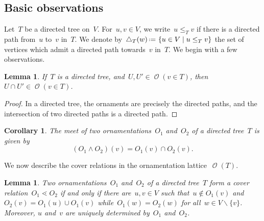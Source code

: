 \documentclass{amsart}
\newtheorem{corollary}[theorem]{Corollary}
\newtheorem{lemma}[theorem]{Lemma}
\theoremstyle{definition}
\renewcommand{\c}[1]{\mathcal{#1}} %
\newcommand{\set}[2]{\left\{ #1 \;\middle|\; #2 \right\}} %
\newcommand{\ssm}{\smallsetminus} %
\newcommand{\eqdef}{\mbox{\,\raisebox{0.2ex}{\scriptsize\ensuremath{\mathrm:}}\ensuremath{=}\,}} %
\newcommand{\meet}{\wedge} %
\DeclareMathOperator{\Orn}{\c{O}}  %
\begin{document}

\subsection{Basic observations}
\label{subsec:basicObservationsT}

Let~$T$ be a directed tree on~$V$.
For~$u,v \in V$, we write~$u \le_T v$ if there is a directed path from~$u$ to~$v$ in~$T$. %
We denote by~$\triangle_T(w) \eqdef \set{u \in V}{u \le_T v}$ the set of vertices which admit a directed path towards~$v$ in~$T$.
We begin with a few observations.

\begin{lemma}
\label{lem:meetOrnT}
If~$T$ is a directed tree, and~$U,U' \in \Orn(v \in T)$, then~$U \cap U' \in \Orn(v \in T)$.
\end{lemma}

\begin{proof}
In a directed tree, the ornaments are precisely the directed paths, and the intersection of two directed paths is a directed path.
\end{proof}

\begin{corollary}
\label{coro:meetOrnT}
The meet of two ornamentations~$O_1$ and~$O_2$ of a directed tree~$T$ is given by
\[
(O_1 \meet O_2)(v) = O_1(v) \cap O_2(v).
\]
\end{corollary}

We now describe the cover relations in the ornamentation lattice~$\Orn(T)$.

\begin{lemma}
\label{lem:coverRelationsOrnT}
Two ornamentations~$O_1$ and~$O_2$ of a directed tree~$T$ form a cover relation~$O_1 \lessdot O_2$ if and only if there are~$u, v \in V$ such that~$u \notin O_1(v)$ and $O_2(v) = O_1(u) \cup O_1(v)$ while~$O_1(w) = O_2(w)$ for all~${w \in V \ssm \{v\}}$.
Moreover, $u$ and~$v$ are uniquely determined by~$O_1$ and~$O_2$.
\end{lemma}
\end{document}

